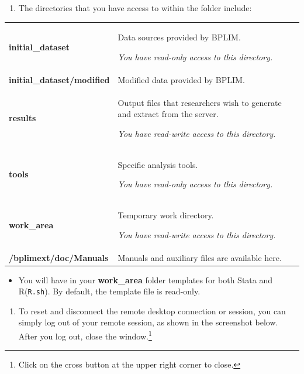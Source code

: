 \documentclass[
  11pt,
  a4paper,
]{article}
\providecommand{\tightlist}{%
  \setlength{\itemsep}{0pt}\setlength{\parskip}{0pt}}
\begin{document}
\begin{enumerate}
\def\labelenumi{\arabic{enumi}.}
\setcounter{enumi}{5}
\tightlist
\item
  The directories that you have access to within the folder include:
\end{enumerate}

\begin{longtable}[]{@{}
  >{\raggedright\arraybackslash}p{}
  >{\raggedright\arraybackslash}p{}@{}}
\toprule\noalign{}
\endhead
\bottomrule\noalign{}
\endlastfoot
\textbf{initial\_dataset} & Data sources provided by BPLIM.

\emph{You have read-only access to this directory.} \\
\textbf{initial\_dataset/modified} & Modified data provided by BPLIM. \\
\textbf{results} & Output files that researchers wish to generate and
extract from the server.

\emph{You have read-write access to this directory.} \\
\textbf{tools} & Specific analysis tools.

\emph{You have read-only access to this directory.} \\
\textbf{work\_area} & Temporary work directory.

\emph{You have read-write access to this directory.} \\
\textbf{/bplimext/doc/Manuals} & Manuals and auxiliary files are
available here. \\
\end{longtable}

\begin{itemize}
\tightlist
\item
  You will have in your \textbf{work\_area} folder templates for both
  Stata and R(\texttt{R.sh}). By default, the template file is
  read-only.
\end{itemize}

\begin{enumerate}
\def\labelenumi{\arabic{enumi}.}
\setcounter{enumi}{6}
\tightlist
\item
  To reset and disconnect the remote desktop connection or session, you
  can simply log out of your remote session, as shown in the screenshot
  below. After you log out, close the window.\footnote{Click on the
    cross button at the upper right corner to close.}
\end{enumerate}
\end{document}
